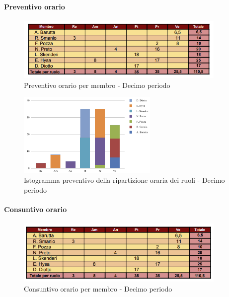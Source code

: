 \paragraph{Preventivo orario}

\begin{figure}[H] 
    \centering
    \includegraphics[width=0.9\textwidth]{../Images/tabPrev10.png}
    \caption{Preventivo orario per membro - Decimo periodo}
    \label{fig:Preventivo_orario_10}
\end{figure}

\begin{figure}[H]
    \centering
    \includegraphics[width=0.6\textwidth]{../Images/graficoConsPrev10.png}
    \caption{Istogramma preventivo della ripartizione oraria dei ruoli - Decimo periodo}
    \label{fig:Preventivo_ripartizione_oraria_10}
\end{figure}

\paragraph{Consuntivo orario}

\begin{figure}[H]
    \centering
    \includegraphics[width=0.9\textwidth]{../Images/tabCons10.png}
    \caption{Consuntivo orario per membro - Decimo periodo}
    \label{fig:Constuntivo_orario_10}
\end{figure}

